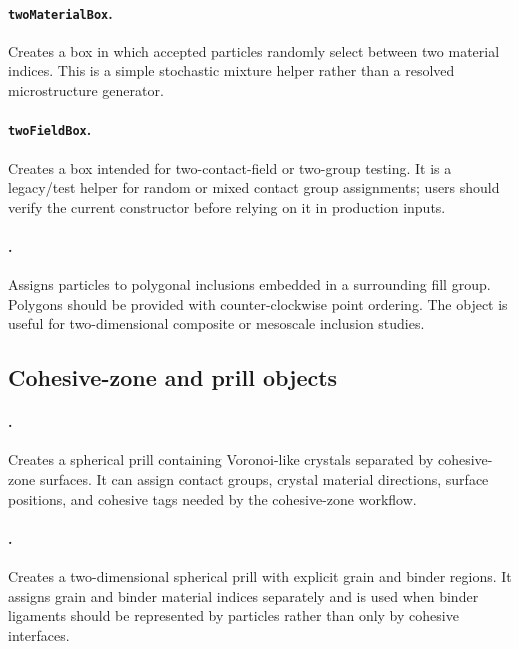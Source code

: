 \paragraph{\texttt{twoMaterialBox}.}Creates a box in which accepted particles randomly select between two material indices.  This is a simple stochastic mixture helper rather than a resolved microstructure generator.

\paragraph{\texttt{twoFieldBox}.}Creates a box intended for two-contact-field or two-group testing.  It is a legacy/test helper for random or mixed contact group assignments; users should verify the current constructor before relying on it in production inputs.

\paragraph{.}Assigns particles to polygonal inclusions embedded in a surrounding fill group.  Polygons should be provided with counter-clockwise point ordering.  The object is useful for two-dimensional composite or mesoscale inclusion studies.

\subsection{Cohesive-zone and prill objects}

\paragraph{.}Creates a spherical prill containing Voronoi-like crystals separated by cohesive-zone surfaces.  It can assign contact groups, crystal material directions, surface positions, and cohesive tags needed by the cohesive-zone workflow.

\paragraph{.}Creates a two-dimensional spherical prill with explicit grain and binder regions.  It assigns grain and binder material indices separately and is used when binder ligaments should be represented by particles rather than only by cohesive interfaces.

